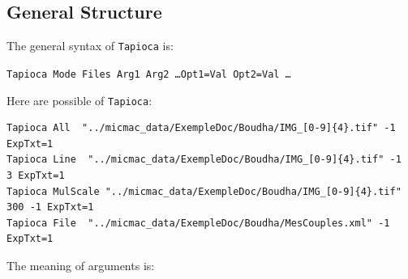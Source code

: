 \label{Tapioca}


\subsection{General Structure}

The general syntax of {\tt Tapioca} is:

\begin{center}
   {\tt Tapioca   Mode  Files  Arg1 Arg2  \dots Opt1=Val Opt2=Val \dots}
\end{center}

Here are possible  of {\tt Tapioca}:

{\scriptsize
\begin{verbatim}
Tapioca All  "../micmac_data/ExempleDoc/Boudha/IMG_[0-9]{4}.tif" -1  ExpTxt=1
Tapioca Line  "../micmac_data/ExempleDoc/Boudha/IMG_[0-9]{4}.tif" -1   3 ExpTxt=1
Tapioca MulScale "../micmac_data/ExempleDoc/Boudha/IMG_[0-9]{4}.tif" 300 -1 ExpTxt=1
Tapioca File  "../micmac_data/ExempleDoc/Boudha/MesCouples.xml" -1  ExpTxt=1
\end{verbatim}
}


The meaning of arguments is:

